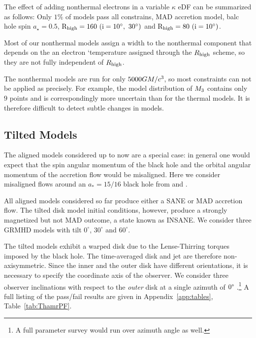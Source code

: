 {The effect of adding nonthermal electrons in a variable $\kappa$ eDF can be summarized as follows: Only $1\%$ of models pass all constrains, MAD accretion model, balc hole spin $a_{\star}=0.5$, $\rm R_{high}=160\ (i=10^{\circ},~30^{\circ})$ and $\rm R_{high}=80\ (i=10^{\circ})$.%



Most of our nonthermal models assign a width to the nonthermal component that depends on the an electron `temperature assigned through the $R_\mathrm{high}$ scheme, so they are not fully independent of $R_\mathrm{high}$.

The nonthermal models are run for only $5000GM/c^3$, so most  constraints can not be applied as precisely.  For example, the model distribution of $M_{3}$ contains only $9$ points and is correspondingly more uncertain than for the thermal models.  It is therefore difficult to detect subtle changes in models.
}

\subsection{Tilted Models}

The aligned models considered up to now are a special case: in general one would expect that the spin angular momentum of the black hole and the orbital angular momentum of the accretion flow would be misaligned. Here we consider misaligned flows around an $a_*=15/16$ black hole from \citet{Liska2018} and \citet{Chatterjee2020}.

All aligned models considered so far produce either a SANE or MAD accretion flow.  The tilted disk model initial conditions, however, produce a strongly magnetized but not MAD outcome, a state known as INSANE.  We consider three GRMHD models with tilt $0^{\circ}$, $30^{\circ}$ and $60^{\circ}$.

The tilted models exhibit a warped disk due to the Lense-Thirring torques imposed by the black hole.  The time-averaged disk and jet are therefore non-axisymmetric.
Since the inner and the outer disk have different orientations, it is necessary to specify the coordinate axis of the observer.  We consider three  observer inclinations with respect to the {\em outer} disk at a single azimuth of $0\degree$ \citep[for more details, see][]{Chatterjee2020}.\footnote{A full parameter survey would run over azimuth angle as well.}  A full listing of the pass/fail results are given in Appendix~\ref{app:tables}, Table~\ref{tab:ThamrPF}.

